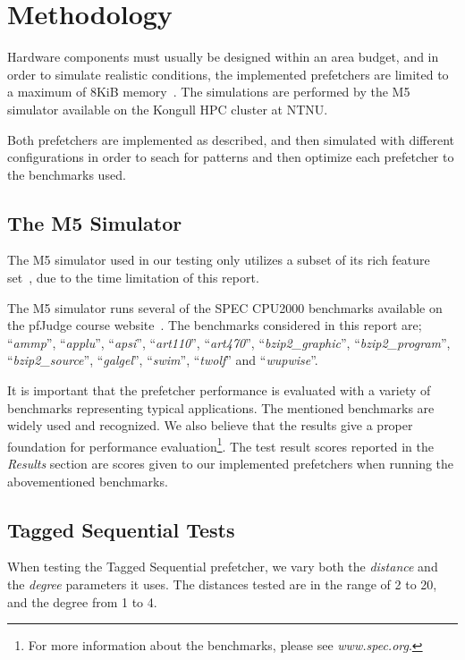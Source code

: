 \section{Methodology}

Hardware components must usually be designed within an area budget, and in order
to simulate realistic conditions, the implemented prefetchers are limited to a
maximum of 8KiB memory~\cite{guidelines}. The simulations are performed by the M5
simulator available on the Kongull HPC cluster at NTNU.

Both prefetchers are implemented as described, and then simulated with different 
configurations in order to seach for patterns and then 
optimize each prefetcher to the benchmarks used.

\subsection{The M5 Simulator}
The M5 simulator used in our testing only utilizes a subset of its rich
feature set~\cite{user_doc}, due to the time limitation of this report.

The M5 simulator runs several of the SPEC CPU2000 benchmarks available on the
pfJudge course website~\cite{guidelines}. The benchmarks considered in this
report are; ``\emph{ammp}'', ``\emph{applu}'', ``\emph{apsi}'',
``\emph{art110}'', ``\emph{art470}'', ``\emph{bzip2\_graphic}'',
``\emph{bzip2\_program}'', ``\emph{bzip2\_source}'', ``\emph{galgel}'',
``\emph{swim}'', ``\emph{twolf}'' and ``\emph{wupwise}''.

It is important that the prefetcher performance is evaluated with a variety of
benchmarks representing typical applications. The mentioned benchmarks are
widely used and recognized. We also believe that the results give a proper
foundation for performance evaluation\footnote{For more information about the
benchmarks, please see \emph{www.spec.org}.}. 
The test result scores reported in the \textit{Results} section are scores given
to our implemented prefetchers when running the abovementioned benchmarks.


\subsection{Tagged Sequential Tests}
When testing the Tagged Sequential prefetcher, we vary both the \emph{distance}
and the \emph{degree} parameters it uses. The distances tested are in the range of 
2 to 20, and the degree from 1 to 4. 


